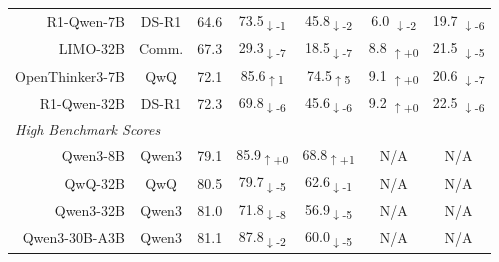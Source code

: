 \documentclass{article} %
\begin{document}
\begin{table}[t]
\begin{tabular}{r|c|c|cc|cc}
    R1-Qwen-7B      & DS-R1 & 64.6 &
    \cellcolor{red!11}73.5\textsubscript{$\downarrow$-1} & 
    \cellcolor{red!12}45.8\textsubscript{$\downarrow$-2} & 
    \cellcolor{red!12} 6.0 \textsubscript{$\downarrow$-2}& 
    \cellcolor{red!16} 19.7 \textsubscript{$\downarrow$-6} \\

    LIMO-32B                &  Comm. & 67.3 & \cellcolor{red!27}29.3\textsubscript{$\downarrow$-7} & \cellcolor{red!27}18.5\textsubscript{$\downarrow$-7} & 
    \cellcolor{green!0} 8.8 \textsubscript{$\uparrow$+0} & 
    \cellcolor{red!15} 21.5 \textsubscript{$\downarrow$-5} \\

    OpenThinker3-7B         & QwQ & 72.1 & \cellcolor{green!11}85.6\textsubscript{$\uparrow$1} & 
    \cellcolor{green!15}74.5\textsubscript{$\uparrow$5} &
    \cellcolor{green!0} 9.1 \textsubscript{$\uparrow$+0} &
    \cellcolor{red!27} 20.6 \textsubscript{$\downarrow$-7} \\

    R1-Qwen-32B     & DS-R1 & 72.3 & \cellcolor{red!16}69.8\textsubscript{$\downarrow$-6} & \cellcolor{red!16}45.6\textsubscript{$\downarrow$-6} & 
    \cellcolor{green!0} 9.2 \textsubscript{$\uparrow$+0} &
    \cellcolor{red!16} 22.5 \textsubscript{$\downarrow$-6} \\

    \midrule
    \multicolumn{7}{l}{\textit{High Benchmark Scores}} \\
    \midrule

    Qwen3-8B                & Qwen3 & 79.1 & \cellcolor{green!0}85.9\textsubscript{$\uparrow$+0} & \cellcolor{green!11}68.8\textsubscript{$\uparrow$+1} & N/A & N/A \\

    QwQ-32B                 & QwQ & 80.5 & \cellcolor{red!15}79.7\textsubscript{$\downarrow$-5} & \cellcolor{red!11}62.6\textsubscript{$\downarrow$-1} & N/A & N/A \\

    Qwen3-32B               & Qwen3 & 81.0 & \cellcolor{red!28}71.8\textsubscript{$\downarrow$-8} & \cellcolor{red!15}56.9\textsubscript{$\downarrow$-5} & N/A & N/A \\

    Qwen3-30B-A3B           & Qwen3 & 81.1 & \cellcolor{red!12}87.8\textsubscript{$\downarrow$-2} & \cellcolor{red!15}60.0\textsubscript{$\downarrow$-5} & N/A & N/A \\


\end{tabular}
\end{table}
\end{document}
